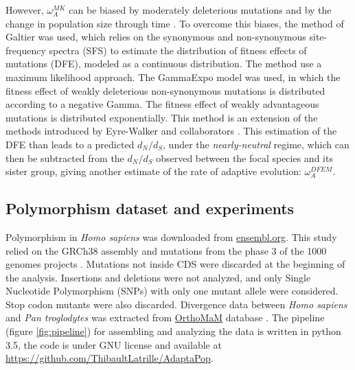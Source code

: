 \documentclass{article}
\begin{document}
	However, $\omega_A^{MK}$ can be biased by moderately deleterious mutations \cite{eyre-walker_quantifying_2002} and by the change in population size through time \cite{eyre-walker_changing_2002}. To overcome this biases, the method of Galtier \cite{galtier_adaptive_2016} was used, which relies on the synonymous and non-synonymous site-frequency spectra (SFS) to estimate the distribution of fitness effects of mutations (DFE), modeled as a continuous distribution. The method use a maximum likelihood approach. The GammaExpo model was used, in which the fitness effect of weakly deleterious non-synonymous mutations is distributed according to a negative Gamma. The fitness effect of weakly advantageous mutations is distributed exponentially. This method is an extension of the methods introduced by Eyre-Walker and collaborators \cite{eyre-walker_distribution_2006, eyre-walker_estimating_2009}. This estimation of the DFE than leads to a predicted $d_N/d_S$, under the \textit{nearly-neutral} regime, which can then be subtracted from the $d_N/d_S$ observed between the focal species and its sister group, giving another estimate of the rate of adaptive evolution: $\omega_A^{DFEM}$.
	\subsection*{Polymorphism dataset and experiments}

	Polymorphism in \textit{Homo sapiens} was downloaded from \href{http://www.ensembl.org/index.html}{ensembl.org}. This study relied on the GRCh38 assembly and mutations from the phase 3 of the 1000 genomes projects \cite{consortium_integrated_2012, the_1000_genomes_project_consortium_global_2015}. Mutations not inside CDS were discarded at the beginning of the analysis. Insertions and deletions were not analyzed, and only Single Nucleotide Polymorphism (SNPs) with only one mutant allele were considered. Stop codon mutants were also discarded. Divergence data between \textit{Homo sapiens} and \textit{Pan troglodytes} was extracted from \href{http://www.orthomam.univ-montp2.fr}{OrthoMaM} database \cite{ranwez_orthomam:_2007, douzery_orthomam_2014}. The pipeline (figure \ref{fig:pipeline}) for assembling and analyzing the data is written in python 3.5, the code is under GNU license and available at \href{https://github.com/ThibaultLatrille/AdaptaPop}{https://github.com/ThibaultLatrille/AdaptaPop}. \\
	
\end{document}

